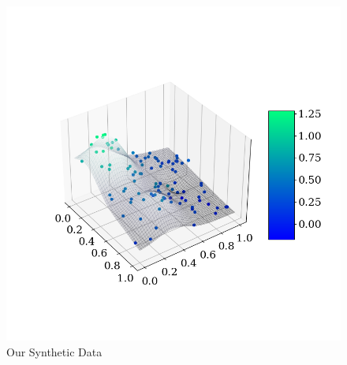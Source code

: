 \documentclass[twoside,11pt]{report}
\begin{document}
\begin{figure}[h]
\begin{minipage}[!t]{.48\linewidth}
\begin{center}
        \includegraphics[width=1.1\textwidth]{../runsAndAdditions/synthDataSide.png}
        \caption{Our Synthetic Data}\label{fig:synthdataside}
    \end{center}
\end{minipage}
\end{figure}
\end{document}
